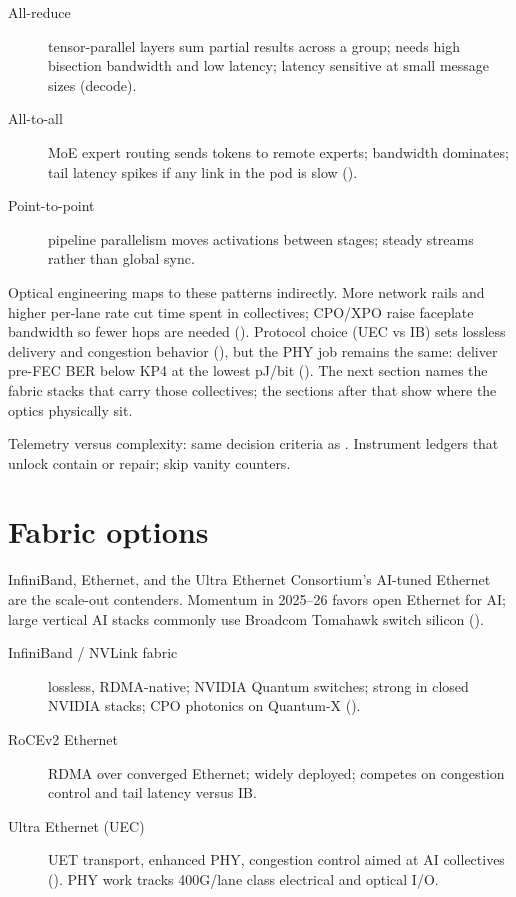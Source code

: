 \begin{description}
\item[All-reduce] tensor-parallel layers sum partial results across a group; needs
      high bisection bandwidth and low latency; latency sensitive at small message
      sizes (decode).
\item[All-to-all] MoE expert routing sends tokens to remote experts; bandwidth
      dominates; tail latency spikes if any link in the pod is slow
      ().
\item[Point-to-point] pipeline parallelism moves activations between stages; steady
      streams rather than global sync.
\end{description}

Optical engineering maps to these patterns indirectly. More network rails and
higher per-lane rate cut time spent in collectives; CPO/XPO raise faceplate
bandwidth so fewer hops are needed
(). Protocol choice (UEC vs
IB) sets lossless delivery and congestion behavior
(), but the PHY job remains the same: deliver pre-FEC
BER below KP4 at the lowest pJ/bit (). The next section
names the fabric stacks that carry those collectives; the sections after that
show where the optics physically sit.



Telemetry versus complexity: same decision criteria as
. Instrument ledgers that unlock contain or
repair; skip vanity counters.

\section{Fabric options}
\label{sec:fabric-protocols}

InfiniBand, Ethernet, and the Ultra Ethernet Consortium's AI-tuned Ethernet are
the scale-out contenders. Momentum in 2025--26 favors open Ethernet for AI; large
vertical AI stacks commonly use Broadcom Tomahawk switch silicon
().

\begin{description}
\item[InfiniBand / NVLink fabric] lossless, RDMA-native; NVIDIA Quantum switches;
      strong in closed NVIDIA stacks; CPO photonics on Quantum-X ().
\item[RoCEv2 Ethernet] RDMA over converged Ethernet; widely deployed; competes on
      congestion control and tail latency versus IB.
\item[Ultra Ethernet (UEC)] UET transport, enhanced PHY, congestion control aimed
      at AI collectives (). PHY work tracks 400G/lane class electrical
      and optical I/O.
\end{description}

